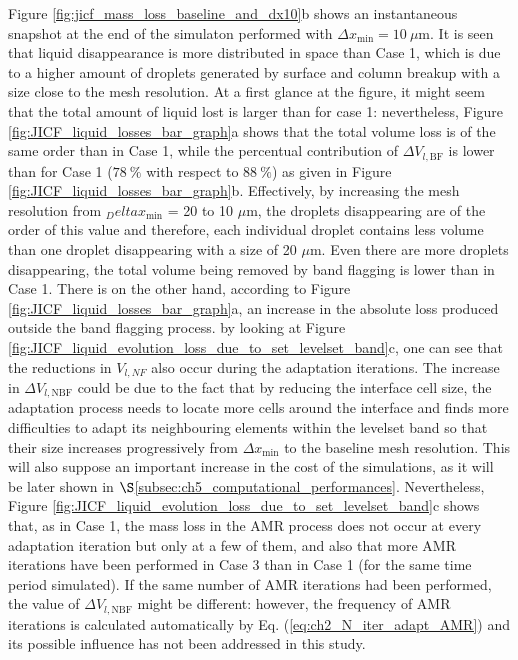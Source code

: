 Figure \ref{fig:jicf_mass_loss_baseline_and_dx10}b shows an instantaneous snapshot at the end of the simulaton performed with $\Delta x_\mathrm{min} = 10~\mu$m. It is seen that liquid disappearance is more distributed in space than Case 1, which is due to a higher amount of droplets generated by surface and column breakup with a size close to the mesh resolution. At a first glance at the figure, it might seem that the total amount of liquid lost is larger than for case 1: nevertheless, Figure \ref{fig:JICF_liquid_losses_bar_graph}a shows that the total volume loss is of the same order than in Case 1, while the percentual contribution of $\Delta V_{l,\mathrm{BF}}$ is lower than for Case 1 ($78~\%$ with respect to $88~\%$) as given in Figure  \ref{fig:JICF_liquid_losses_bar_graph}b. Effectively, by increasing the mesh resolution from $_Delta x_\mathrm{min}$ = 20 to 10 $\mu$m, the droplets disappearing are of the order of this value and therefore, each individual droplet contains less volume than one droplet disappearing with a size of 20 $\mu$m. Even there are more droplets disappearing, the total volume being removed by band flagging is lower than in Case 1. There is on the other hand, according to Figure \ref{fig:JICF_liquid_losses_bar_graph}a, an increase in the absolute loss produced outside the band flagging process. by looking at Figure \ref{fig:JICF_liquid_evolution_loss_due_to_set_levelset_band}c, one can see that the reductions in $V_{l,NF}$ also occur during the adaptation iterations. The increase in $\Delta V_{l,\mathrm{NBF}}$ could be due to the fact that by reducing the interface cell size, the adaptation process needs to locate more cells around the interface and finds more difficulties to adapt its neighbouring elements within the levelset band so that their size increases progressively from $\Delta x_\mathrm{min}$ to the baseline mesh resolution. This will also suppose an important increase in the cost of the simulations, as it will be later shown in $\S$\ref{subsec:ch5_computational_performances}. Nevertheless, Figure \ref{fig:JICF_liquid_evolution_loss_due_to_set_levelset_band}c shows that, as in Case 1, the mass loss in the AMR process does not occur at every adaptation iteration but only at a few of them, and also that more AMR iterations have been performed in Case 3 than in Case 1 (for the same time period simulated). If the same number of AMR iterations had been performed, the value of $\Delta V_{l,\mathrm{NBF}}$ might be different: however, the frequency of AMR iterations is calculated automatically by Eq. (\ref{eq:ch2_N_iter_adapt_AMR}) and its possible influence has not been addressed in this study. 




